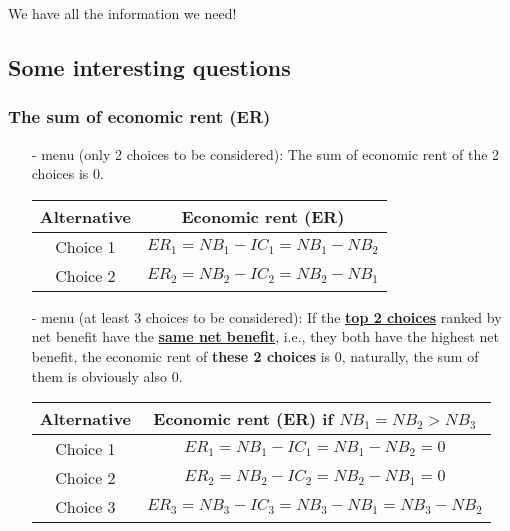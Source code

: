 \documentclass[twoside]{article}
\theoremstyle{definition}
\begin{document}
We have all the information we need!

\subsection*{Some interesting questions}
\subsubsection*{The sum of economic rent (ER)}
\begin{itemize}
    \item[-]  menu (only 2 choices to be considered): The sum of economic rent of the 2 choices is 0.
    \begin{table}[h]
    \centering
        \begin{tabular}{c|c}
            Alternative & Economic rent (ER) \\
            \hline
            Choice 1 & $ER_1= NB_1 - IC_1 = NB_1- NB_2$ \\
            Choice 2 & $ER_2= NB_2 - IC_2 = NB_2- NB_1$
        \end{tabular}
    \end{table}
    
    \item[-]  menu (at least 3 choices to be considered): If the \underline{\textbf{top 2 choices}} ranked by net benefit have the \underline{\textbf{same net benefit}}, i.e., they both have the highest net benefit, the economic rent of \textbf{these 2 choices} is 0, naturally, the sum of them is obviously also 0.
    
    \begin{table}[h]
    \centering
        \begin{tabular}{c|c}
            Alternative & Economic rent (ER) if $NB_1 = NB_2 > NB_3$ \\
            \hline
            Choice 1 & $ER_1 = NB_1 - IC_1 = NB_1- NB_2 = 0$ \\
            Choice 2 & $ER_2 = NB_2 - IC_2 = NB_2- NB_1 = 0$ \\
            Choice 3 & $ER_3 = NB_3 - IC_3 = NB_3- NB_1 = NB_3 - NB_2$
        \end{tabular}
    \end{table}
    
\end{itemize}
\end{document}
